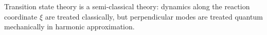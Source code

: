 \documentclass[11pt,DIV=13,BCOR=5mm,a4paper,headinclude]{scrbook}
\begin{document}

Transition state theory is a semi-classical theory: dynamics along the reaction coordinate $\xi$ are treated classically, but perpendicular modes are treated quantum mechanically in harmonic approximation.
\end{document}
